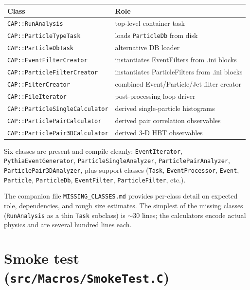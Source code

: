 \documentclass[11pt,a4paper]{article}
\begin{document}
\begin{center}\small
\begin{longtable}{lp{8cm}}
\toprule
\textbf{Class} & \textbf{Role} \\
\midrule\endhead
\texttt{CAP::RunAnalysis}              & top-level container task \\
\texttt{CAP::ParticleTypeTask}         & loads \texttt{ParticleDb} from disk \\
\texttt{CAP::ParticleDbTask}           & alternative DB loader \\
\texttt{CAP::EventFilterCreator}       & instantiates EventFilters from .ini blocks \\
\texttt{CAP::ParticleFilterCreator}    & instantiates ParticleFilters from .ini blocks \\
\texttt{CAP::FilterCreator}            & combined Event/Particle/Jet filter creator \\
\texttt{CAP::FileIterator}             & post-processing loop driver \\
\texttt{CAP::ParticleSingleCalculator} & derived single-particle histograms \\
\texttt{CAP::ParticlePairCalculator}   & derived pair correlation observables \\
\texttt{CAP::ParticlePair3DCalculator} & derived 3-D HBT observables \\
\bottomrule
\end{longtable}
\end{center}

\noindent
Six classes are present and compile cleanly:
\texttt{EventIterator}, \texttt{PythiaEventGenerator},
\texttt{ParticleSingleAnalyzer}, \texttt{ParticlePairAnalyzer},
\texttt{ParticlePair3DAnalyzer}, plus support classes (\texttt{Task},
\texttt{EventProcessor}, \texttt{Event}, \texttt{Particle},
\texttt{ParticleDb}, \texttt{EventFilter}, \texttt{ParticleFilter}, etc.).

The companion file \texttt{MISSING\_CLASSES.md} provides per-class detail on
expected role, dependencies, and rough size estimates. The simplest of the
missing classes (\texttt{RunAnalysis} as a thin \texttt{Task} subclass) is
$\sim$30 lines; the calculators encode actual physics and are several
hundred lines each.

\section{Smoke test (\texttt{src/Macros/SmokeTest.C})}
\label{sec:smoketest}
\end{document}
